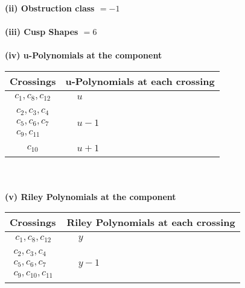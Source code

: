 \documentclass[1p]{elsarticle_modified}
\theoremstyle{definition}
\begin{document}
\flushleft \textbf{(ii) Obstruction class $= -1$}\\~\\
\flushleft \textbf{(iii) Cusp Shapes $= 6$}\\~\\
\newpage\renewcommand{\arraystretch}{1}
\flushleft \textbf{(iv) u-Polynomials at the component}\newline \\
\begin{tabular}{m{50pt}|m{274pt}}
Crossings & \hspace{64pt}u-Polynomials at each crossing \\
\hline $$\begin{aligned}c_{1},c_{8},c_{12}\end{aligned}$$&$\begin{aligned}
&u
\end{aligned}$\\
\hline $$\begin{aligned}c_{2},c_{3},c_{4}\\c_{5},c_{6},c_{7}\\c_{9},c_{11}\end{aligned}$$&$\begin{aligned}
&u-1
\end{aligned}$\\
\hline $$\begin{aligned}c_{10}\end{aligned}$$&$\begin{aligned}
&u+1
\end{aligned}$\\
\hline
\end{tabular}\\~\\
\newpage\renewcommand{\arraystretch}{1}
\flushleft \textbf{(v) Riley Polynomials at the component}\newline \\
\begin{tabular}{m{50pt}|m{274pt}}
Crossings & \hspace{64pt}Riley Polynomials at each crossing \\
\hline $$\begin{aligned}c_{1},c_{8},c_{12}\end{aligned}$$&$\begin{aligned}
&y
\end{aligned}$\\
\hline $$\begin{aligned}c_{2},c_{3},c_{4}\\c_{5},c_{6},c_{7}\\c_{9},c_{10},c_{11}\end{aligned}$$&$\begin{aligned}
&y-1
\end{aligned}$\\
\hline
\end{tabular}\\~\\
\end{document}
